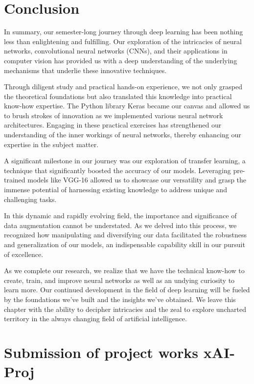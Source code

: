 \documentclass[12pt,a4paper]{article}
\begin{document}
\section{Conclusion}
In summary, our semester-long journey through deep learning has been nothing less than enlightening and fulfilling. Our exploration of the intricacies of neural networks, convolutional neural networks (CNNs), and their applications in computer vision has provided us with a deep understanding of the underlying mechanisms that underlie these innovative techniques.

Through diligent study and practical hands-on experience, we not only grasped the theoretical foundations but also translated this knowledge into practical know-how expertise. The Python library Keras became our canvas and allowed us to brush strokes of innovation as we implemented various neural network architectures. Engaging in these practical exercises has strengthened our understanding of the inner workings of neural networks, thereby enhancing our expertise in the subject matter.

A significant milestone in our journey was our exploration of transfer learning, a technique that significantly boosted the accuracy of our models. Leveraging pre-trained models like VGG-16 allowed us to showcase our versatility and grasp the immense potential of harnessing existing knowledge to address unique and challenging tasks.

In this dynamic and rapidly evolving field, the importance and significance of data augmentation cannot be understated. As we delved into this process, we recognized how manipulating and diversifying our data facilitated the robustness and generalization of our models, an indispensable capability skill in our pursuit of excellence.

As we complete our research, we realize that we have the technical know-how to create, train, and improve neural networks as well as an undying curiosity to learn more. Our continued development in the field of deep learning will be fueled by the foundations we've built and the insights we've obtained. We leave this chapter with the ability to decipher intricacies and the zeal to explore uncharted territory in the always changing field of artificial intelligence.

\section*{Submission of project works xAI-Proj}
\end{document}
